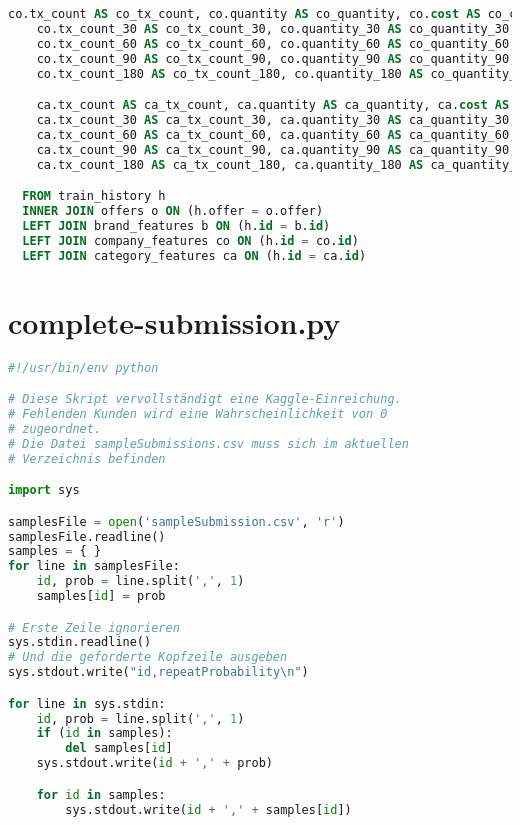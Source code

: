 \begin{lstlisting}[language=SQL]
    co.tx_count AS co_tx_count, co.quantity AS co_quantity, co.cost AS co_cost,
    co.tx_count_30 AS co_tx_count_30, co.quantity_30 AS co_quantity_30, co.cost_30 AS co_cost_30,
    co.tx_count_60 AS co_tx_count_60, co.quantity_60 AS co_quantity_60, co.cost_60 AS co_cost_60,
    co.tx_count_90 AS co_tx_count_90, co.quantity_90 AS co_quantity_90, co.cost_90 AS co_cost_90,
    co.tx_count_180 AS co_tx_count_180, co.quantity_180 AS co_quantity_180, co.cost_180 AS co_cost_180,

    ca.tx_count AS ca_tx_count, ca.quantity AS ca_quantity, ca.cost AS ca_cost,
    ca.tx_count_30 AS ca_tx_count_30, ca.quantity_30 AS ca_quantity_30, ca.cost_30 AS ca_cost_30,
    ca.tx_count_60 AS ca_tx_count_60, ca.quantity_60 AS ca_quantity_60, ca.cost_60 AS ca_cost_60,
    ca.tx_count_90 AS ca_tx_count_90, ca.quantity_90 AS ca_quantity_90, ca.cost_90 AS ca_cost_90,
    ca.tx_count_180 AS ca_tx_count_180, ca.quantity_180 AS ca_quantity_180, ca.cost_180 AS ca_cost_180

  FROM train_history h
  INNER JOIN offers o ON (h.offer = o.offer)
  LEFT JOIN brand_features b ON (h.id = b.id)
  LEFT JOIN company_features co ON (h.id = co.id)
  LEFT JOIN category_features ca ON (h.id = ca.id)
\end{lstlisting}

\section{complete-submission.py}
\label{code:complete-submission}
\begin{lstlisting}[language=Python]
#!/usr/bin/env python

# Diese Skript vervollständigt eine Kaggle-Einreichung.
# Fehlenden Kunden wird eine Wahrscheinlichkeit von 0 
# zugeordnet.
# Die Datei sampleSubmissions.csv muss sich im aktuellen 
# Verzeichnis befinden

import sys

samplesFile = open('sampleSubmission.csv', 'r')
samplesFile.readline()
samples = { }
for line in samplesFile:
	id, prob = line.split(',', 1)
	samples[id] = prob

# Erste Zeile ignorieren
sys.stdin.readline()
# Und die geforderte Kopfzeile ausgeben
sys.stdout.write("id,repeatProbability\n")

for line in sys.stdin:
	id, prob = line.split(',', 1)
	if (id in samples):
		del samples[id]
	sys.stdout.write(id + ',' + prob)

	for id in samples:
		sys.stdout.write(id + ',' + samples[id])
\end{lstlisting}

